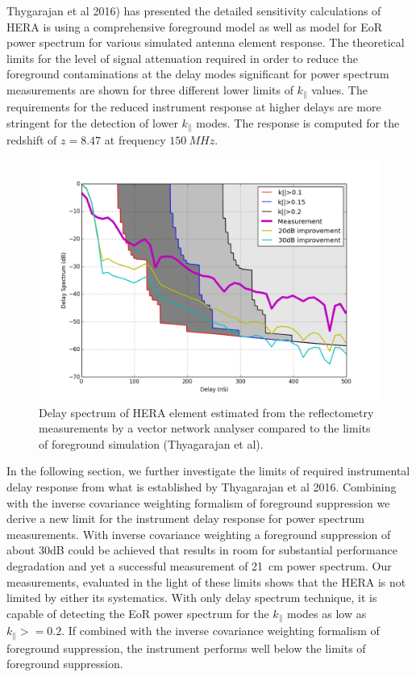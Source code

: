 \documentclass[twocolumn]{emulateapj}
\begin{document}
Thygarajan et al 2016) has presented the detailed sensitivity calculations of HERA is using a comprehensive foreground model as well as model for EoR power spectrum for various simulated antenna element response. The theoretical limits for the level of signal attenuation required in order to reduce the foreground contaminations at the delay modes significant for power spectrum measurements are shown for three different lower limits of $k_\parallel$ values. The requirements for the reduced instrument response at higher delays are more stringent for the detection of lower $k_\parallel$ modes. The response is computed for the redshift of $z=8.47$ at frequency $150~MHz$. \\
\begin{figure}
\centering
\includegraphics[width=\linewidth]{plots/meas_forground.png}
\caption{Delay spectrum of HERA element estimated from the reflectometry measurements by a vector network analyser compared to the limits of foreground simulation (Thyagarajan et al).}
\label{fig:sim_fg}
\end{figure}

In the following section, we further investigate the limits of required instrumental delay response from what is established by Thyagarajan et al 2016. Combining with the  inverse covariance weighting formalism of foreground suppression we derive a new limit for the instrument delay response for power spectrum measurements. With inverse covariance weighting a foreground suppression of about 30dB could be achieved that results in room for substantial performance degradation and yet a successful measurement of 21~cm power spectrum. Our measurements, evaluated in the light of these limits shows that the HERA is not limited by either its systematics. With only delay spectrum technique, it is capable of detecting the EoR power spectrum for the $k_{\parallel}$ modes as low as $k_{\parallel}>=0.2$. If combined with the inverse covariance weighting formalism of foreground suppression, the instrument performs well below the limits of foreground suppression.    
\end{document}
